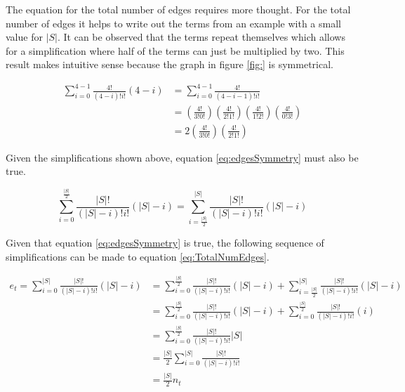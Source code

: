 \documentclass{article}
\begin{document}
The equation for the total number of edges requires more thought. For the total number of edges it helps to write out the terms from an example with a small value for $|S|$. It can be observed that the terms repeat themselves which allows for a simplification where half of the terms can just be multiplied by two. This result makes intuitive sense because the graph in figure \ref{fig:} is symmetrical.

\begin{equation*}
    \begin{split}
        \sum_{i=0}^{4-1}\frac{4!}{(4-i)!i!}(4-i)&=
        \sum_{i=0}^{4-1}\frac{4!}{(4-i-1)!i!}
        \\
        &=
        \left(\frac{4!}{3!0!}\right)
        \left(\frac{4!}{2!1!}\right)
        \left(\frac{4!}{1!2!}\right)
        \left(\frac{4!}{0!3!}\right)
        \\
        &=
        2
        \left(\frac{4!}{3!0!}\right)
        \left(\frac{4!}{2!1!}\right)
    \end{split}
\end{equation*}

Given the simplifications shown above, equation \ref{eq:edgesSymmetry} must also be true.

\begin{equation}
    \sum_{i=0}^{\frac{|S|}{2}}\frac{|S|!}{(|S|-i)!i!}\left(|S|-i\right)=
    \sum_{i=\frac{|S|}{2}}^{|S|}\frac{|S|!}{(|S|-i)!i!}\left(|S|-i\right)
    \label{eq:edgesSymmetry}
\end{equation}

Given that equation \ref{eq:edgesSymmetry} is true, the following sequence of simplifications can be made to equation \ref{eq:TotalNumEdges}.

\begin{equation*}
    \begin{split}
        e_t=\sum_{i=0}^{|S|}\frac{|S|!}{(|S|-i)!i!}\left(|S|-i\right)&=
        \sum_{i=0}^{\frac{|S|}{2}}\frac{|S|!}{(|S|-i)!i!}\left(|S|-i\right)+
        \sum_{i=\frac{|S|}{2}}^{|S|}\frac{|S|!}{(|S|-i)!i!}\left(|S|-i\right)
        \\
        &=
        \sum_{i=0}^{\frac{|S|}{2}}\frac{|S|!}{(|S|-i)!i!}\left(|S|-i\right)+
        \sum_{i=0}^{\frac{|S|}{2}}\frac{|S|!}{(|S|-i)!i!}\left(i\right)
        \\
        &=
        \sum_{i=0}^{\frac{|S|}{2}}\frac{|S|!}{(|S|-i)!i!}|S|
        \\
        &=
        \frac{|S|}{2}\sum_{i=0}^{|S|}\frac{|S|!}{(|S|-i)!i!}
        \\
        &=
        \frac{|S|}{2}n_t
    \end{split}
\end{equation*}
\end{document}
